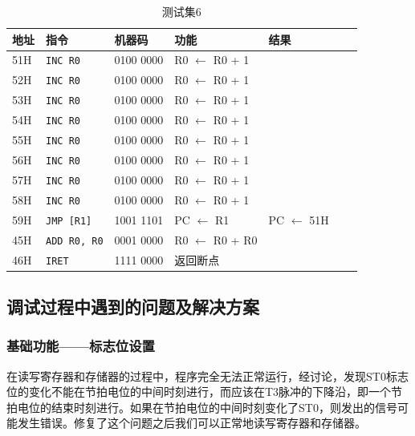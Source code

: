 \documentclass[lang=cn,11pt,a4paper,cite=authornum]{paper}
\begin{document}
\begin{table}[!htbp]
    \centering
    
    \caption{测试集6\label{tab:base_test_6}}
    
		\begin{tabular}{|l|l|l|l|l|l|l|}
		   			\hline 
			地址 & 指令 & 机器码 & 功能 & 结果 \\ \hline  
			51H & \texttt{INC R0} & 0100 0000 & R0 $\leftarrow$ R0 + 1 &  \\ \hline  
			52H & \texttt{INC R0} & 0100 0000 & R0 $\leftarrow$ R0 + 1 &  \\ \hline  
			53H & \texttt{INC R0} & 0100 0000 & R0 $\leftarrow$ R0 + 1 &  \\ \hline  
			54H & \texttt{INC R0} & 0100 0000 & R0 $\leftarrow$ R0 + 1 &  \\ \hline  
			55H & \texttt{INC R0} & 0100 0000 & R0 $\leftarrow$ R0 + 1 &  \\ \hline  
			56H & \texttt{INC R0} & 0100 0000 & R0 $\leftarrow$ R0 + 1 &  \\ \hline  
			57H & \texttt{INC R0} & 0100 0000 & R0 $\leftarrow$ R0 + 1 &  \\ \hline  
			58H & \texttt{INC R0} & 0100 0000 & R0 $\leftarrow$ R0 + 1 &  \\ \hline  
			59H & \texttt{JMP [R1]} & 1001 1101 & PC $\leftarrow$ R1 & PC $\leftarrow$ 51H \\ \hline  
			45H & \texttt{ADD R0, R0} & 0001 0000 & R0 $\leftarrow$ R0 + R0 &  \\ \hline  
			46H & \texttt{IRET} & 1111 0000 & 返回断点 &  \\ \hline  
		\end{tabular}
\end{table}


\subsection{调试过程中遇到的问题及解决方案}

\subsubsection{基础功能——标志位设置}

在读写寄存器和存储器的过程中，程序完全无法正常运行，经讨论，发现ST0标志位的变化不能在节拍电位的中间时刻进行，而应该在T3脉冲的下降沿，即一个节拍电位的结束时刻进行。如果在节拍电位的中间时刻变化了ST0，则发出的信号可能发生错误。修复了这个问题之后我们可以正常地读写寄存器和存储器。
\end{document}
